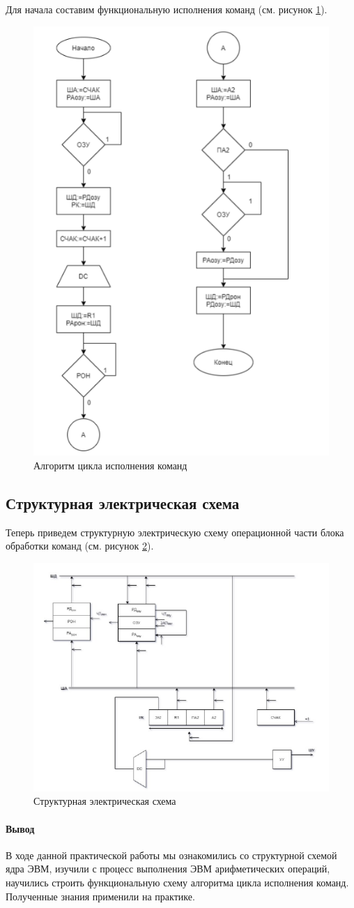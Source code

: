 \documentclass[a4paper,14pt]{extarticle}
\begin{document}
Для
начала
составим
функциональную
исполнения команд (см. рисунок \ref{fig:algorithm-pr-2}).

\begin{figure}[h!]
	\centering
	\includegraphics[width=0.5\linewidth]{images/algorithm-pr-2}
	\caption{Алгоритм цикла исполнения команд}
	\label{fig:algorithm-pr-2}
\end{figure}
\subsection*{Структурная электрическая схема}

Теперь приведем структурную электрическую схему операционной
части блока обработки команд (см. рисунок \ref{fig:struct-scheme}).

\begin{figure}[h!]
	\centering
	\includegraphics[width=0.6\linewidth]{images/struct-scheme}
	\caption{Структурная электрическая схема}
	\label{fig:struct-scheme}
\end{figure}


\newpage
\paragraph{Вывод}

В ходе данной практической работы мы ознакомились со структурной
схемой ядра ЭВМ, изучили с процесс выполнения ЭВМ арифметических
операций, научились строить функциональную схему алгоритма цикла
исполнения команд. Полученные знания применили на практике.
\end{document}
